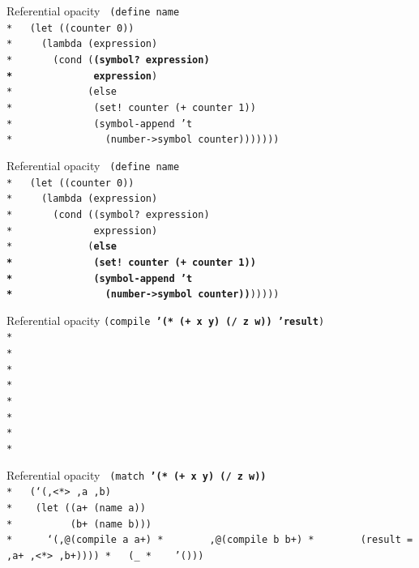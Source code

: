 \documentclass{beamer}
\begin{document}
\begin{frame}{Referential opacity}
  \texttt{
    (define name \\*
    \ \ (let ((counter 0)) \\*
    \ \ \ \ (lambda (expression)\\*
    \ \ \ \ \ \ (cond (\textbf{(symbol? expression)\\*
    \ \ \ \ \ \ \ \ \ \ \ \ \ expression})\\*
    \ \ \ \ \ \ \ \ \ \ \ \ (else\\*
    \ \ \ \ \ \ \ \ \ \ \ \ \ (set! counter (+ counter 1))\\*
    \ \ \ \ \ \ \ \ \ \ \ \ \ (symbol-append 't\\*
    \ \ \ \ \ \ \ \ \ \ \ \ \ \ \ (number->symbol counter)))))))
  }
\end{frame}

\begin{frame}{Referential opacity}
  \texttt{
    (define name \\*
    \ \ (let ((counter 0)) \\*
    \ \ \ \ (lambda (expression)\\*
    \ \ \ \ \ \ (cond ((symbol? expression)\\*
    \ \ \ \ \ \ \ \ \ \ \ \ \ expression)\\*
    \ \ \ \ \ \ \ \ \ \ \ \ (\textbf{else\\*
    \ \ \ \ \ \ \ \ \ \ \ \ \ (set! counter (+ counter 1))\\*
    \ \ \ \ \ \ \ \ \ \ \ \ \ (symbol-append 't\\*
    \ \ \ \ \ \ \ \ \ \ \ \ \ \ \ (number->symbol counter))})))))
  }
\end{frame}

\begin{frame}{Referential opacity}
  \texttt{(compile \textbf{'(* (+ x y) (/ z w)) 'result})\\*
    \ \\*
    \ \\*
    \ \\*
    \ \\*
    \ \\*
    \ \\*
    \ \\*
    \ }
\end{frame}

\begin{frame}{Referential opacity}
  \texttt{
    (match \textbf{'(* (+ x y) (/ z w))}\\*
    \ \ (`(,<*> ,a ,b)\\*
    \ \ \ (let ((a+ (name a))\\*
    \ \ \ \ \ \ \ \ \ (b+ (name b)))\\*
    \ \ \ \ \ `(,@(compile a a+)\\*
    \ \ \ \ \ \ \ ,@(compile b b+)\\*
    \ \ \ \ \ \ \ (\textbf{result} = ,a+ ,<*> ,b+))))\\*
    \ \ (\_\\*
    \ \ \ '()))
}
\end{frame}
\end{document}
